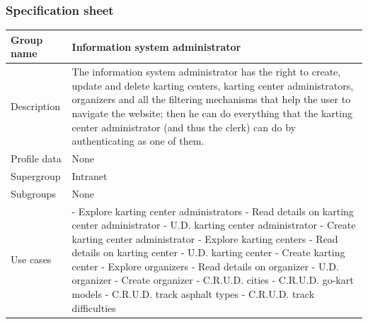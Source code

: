 \documentclass{beamer}
\begin{document}
\begin{frame}
    \frametitle{Specification sheet}
    \begin{table}
        \tiny
        \begin{tabular}{|p{2cm}|p{6cm}|}
        \hline
        Group name & \textbf{Information system administrator} \\
        \hline
        Description & The information system administrator has the right to create, update and delete karting centers,
        karting center administrators, organizers and all the filtering mechanisms that help the user to navigate the website;
        then he can do everything that the karting center administrator (and thus the clerk) can do by authenticating as one of them. \\
        \hline
        Profile data & None \\
        \hline
        Supergroup & Intranet \\
        \hline
        Subgroups & None \\
        \hline
        Use cases & 
        - Explore karting center administrators \newline
        - Read details on karting center administrator \newline
        - U.D. karting center administrator \newline
        - Create karting center administrator \newline
        - Explore karting centers \newline
        - Read details on karting center \newline
        - U.D. karting center \newline
        - Create karting center \newline
        - Explore organizers \newline
        - Read details on organizer \newline
        - U.D. organizer \newline
        - Create organizer \newline
        - C.R.U.D. cities \newline
        - C.R.U.D. go-kart models \newline
        - C.R.U.D. track asphalt types \newline
        - C.R.U.D. track difficulties \\
        \hline
        \end{tabular}
    \end{table}
\end{frame}
\end{document}
